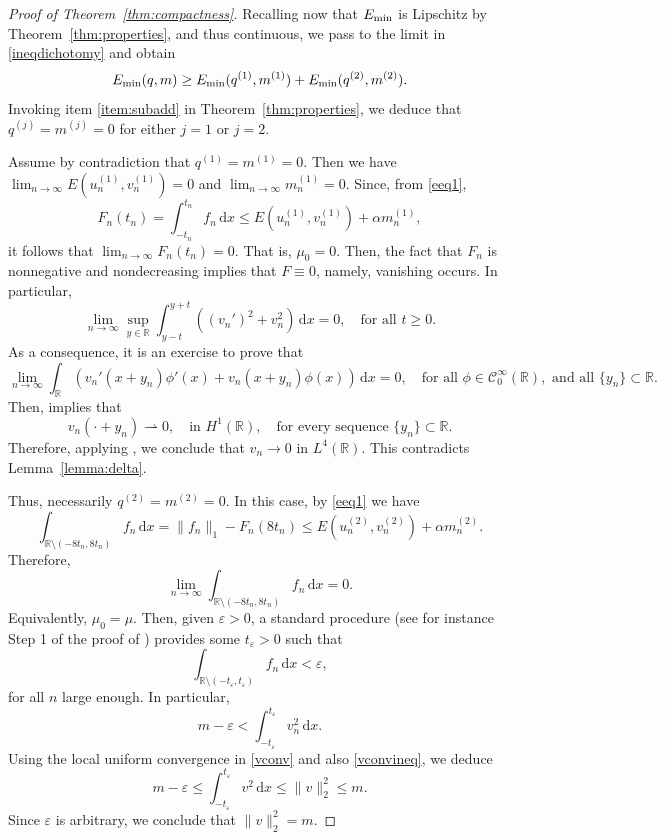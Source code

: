\documentclass[11pt]{article}
\newcommand{\R}{\mathbb{R}}
\newcommand{\boC}{\mathcal{C}}
\newcommand{\Emin}{E_\textup{min}}
\renewcommand{\d}{\,\mathrm{d}}
\theoremstyle{plain}
\theoremstyle{definition}
\theoremstyle{remark}
\numberwithin{equation}{section}
\begin{document}
{\begin{proof}[Proof of Theorem~\ref{thm:compactness}]
    Recalling now that $\Emin$ is Lipschitz by Theorem~\ref{thm:properties}, and thus continuous, we pass to the limit in \eqref{ineqdichotomy} and obtain
    \[\Emin(q,m)\geq \Emin(q^{(1)},m^{(1)}) + \Emin(q^{(2)},m^{(2)}).\]
    Invoking item \ref{item:subadd} in Theorem~\ref{thm:properties}, we deduce that  $q^{(j)}=m^{(j)}=0$ for either $j=1$ or $j=2$. 

    
    Assume by contradiction that $q^{(1)}=m^{(1)}=0$. Then we have  $\lim_{n\to\infty}E(u_n^{(1)},v_n^{(1)})=0$ and $\lim_{n\to\infty}m_n^{(1)}=0$. Since, from \eqref{eeq1},     
    \[F_n(t_n)=\int_{-t_n}^{t_n}f_n\d x\leq E(u_n^{(1)},v_n^{(1)})+\alpha m_n^{(1)},\]
    it follows that $\lim_{n\to\infty}F_n(t_n)=0$. That is, $\mu_0=0$. Then, the fact that $F_n$ is nonnegative and nondecreasing implies that $F\equiv 0$, namely, vanishing occurs. In particular, 
    \[\lim_{n\to\infty}\sup_{y\in\R}\int_{y-t}^{y+t} ((v_n')^2+v_n
    ^2)\d x=0,\quad\text{for all }t\geq 0.\]
    As a consequence, it is an exercise to prove that
    \[\lim_{n\to\infty}\int_\R (v_n'(x+y_n)\phi'(x)+v_n(x+y_n)\phi(x))\d x= 0,\quad\text{for all }\phi\in\boC_0^\infty(\R),\text{ and all }\{y_n\}\subset\R.\]
    Then, \cite[Lemma~{1.2}]{tintarev-fieseler} implies that  
    \[v_n(\cdot+y_n)\rightharpoonup 0,\quad\text{in }H^1(\R),\quad\text{for every sequence }\{y_n\}\subset\R.\]
    Therefore, applying \cite[Lemma~{3.3}]{tintarev-fieseler}, we conclude that $v_n\to 0$ in $L^4(\R)$. This contradicts Lemma~\ref{lemma:delta}.

   Thus, necessarily $q^{(2)}=m^{(2)}=0$. In this case, by \eqref{eeq1} we have
   \[\int_{\R\setminus(-8t_n,8t_n)}f_n\d x=\|f_n\|_1 - F_n(8t_n)\leq E(u_n^{(2)},v_n^{(2)})+\alpha m_n^{(2)}.\]
   Therefore, 
   \[\lim_{n\to\infty}\int_{\R\setminus(-8t_n,8t_n)}f_n\d x=0.\]
   {Equivalently, $\mu_0=\mu$. }Then, given $\varepsilon>0$, a standard procedure {(see for instance Step 1 of the proof of \cite[Proposition~{1.7.6}]{cazenave})} provides some $t_\varepsilon>0$ such that
   \[\int_{\R\setminus(-t_{\varepsilon},t_{\varepsilon})}f_n\d x<\varepsilon,\]
   for all $n$ large enough. In particular,
   \[m-\varepsilon<\int_{-t_\varepsilon}^{t_\varepsilon}v_n^2\d x.\]
   Using the local uniform convergence in \eqref{vconv} and also \eqref{vconvineq}, we deduce
   \[m-\varepsilon\leq \int_{-t_\varepsilon}^{t_\varepsilon}v^2\d x\leq \|v\|_2^2\leq m.\]
   Since $\varepsilon$ is arbitrary, we conclude that $\|v\|_2^2=m$.


\end{proof}}
\end{document}
